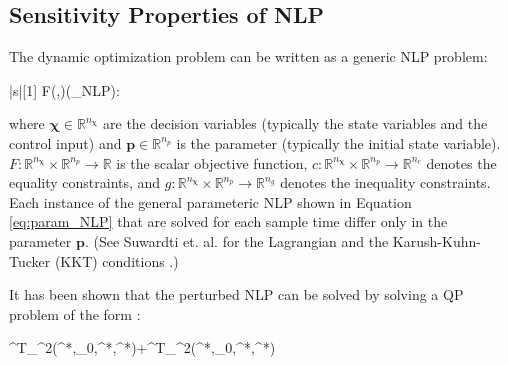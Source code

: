 \subsection{Sensitivity Properties of NLP}
The dynamic optimization problem can be written as a generic NLP problem:
\begin{mini!}|s|[1]
	{}{F(\boldsymbol{\chi},)}{\label{eq:param_NLP}}{(_{NLP}):}
\end{mini!}
where $\boldsymbol{\chi}\in\mathbb{R}^{n_{\boldsymbol{\chi}}}$ are the decision variables (typically the state variables and the control input) and $\boldsymbol{p}\in\mathbb{R}^{n_p}$ is the parameter (typically the initial state variable).
$F:\mathbb{R}^{n_{\boldsymbol{\chi}}}\times \mathbb{R}^{n_p}\rightarrow\mathbb{R}$  is the scalar objective function, $c:\mathbb{R}^{n_{\boldsymbol{\chi}}}\times \mathbb{R}^{n_p}\rightarrow\mathbb{R}^{n_c}$ denotes the equality constraints, and $g:\mathbb{R}^{n_{\boldsymbol{\chi}}}\times \mathbb{R}^{n_p}\rightarrow\mathbb{R}^{n_g}$ denotes the inequality constraints.
Each instance of the general parameteric NLP shown in Equation \ref{eq:param_NLP} that are solved for each sample time differ only in the parameter $\boldsymbol{p}$.
(See Suwardti et. al. for the Lagrangian and the Karush-Kuhn-Tucker (KKT) conditions \cite{economic}.)
\par
It has been shown that the perturbed NLP can be solved by solving a QP problem of the form \cite{perturb}:
\begin{mini!}
	{\Delta\boldsymbol{\chi}}{\boldsymbol{\chi}^T\nabla_{\boldsymbol{\chi}\boldsymbol{\chi}}^2\Lagrange(\boldsymbol{\chi}^*,_0,\boldsymbol{\lambda}^*,\boldsymbol{\mu}^*)\Delta\boldsymbol{\chi}+\Delta\boldsymbol{\chi}^T\nabla_{\boldsymbol{\chi}}^2\Lagrange(\boldsymbol{\chi}^*,_0,\boldsymbol{\lambda}^*,\boldsymbol{\mu}^*)\Delta {}}{}{\label{eq:QP}}
\end{mini!}
